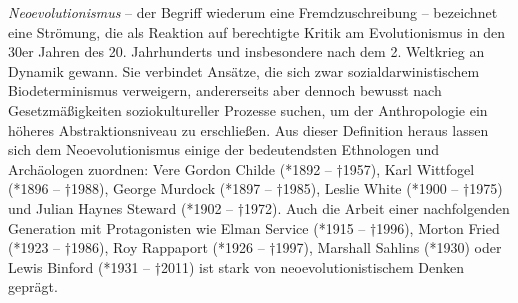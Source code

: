 \documentclass[openany,twoside,twocolumn]{book}
\begin{document}
\emph{Neoevolutionismus} -- der Begriff wiederum eine Fremdzuschreibung
-- bezeichnet eine Strömung, die als Reaktion auf berechtigte Kritik am
Evolutionismus in den 30er Jahren des 20. Jahrhunderts und insbesondere
nach dem 2. Weltkrieg an Dynamik gewann. Sie verbindet Ansätze, die sich
zwar sozialdarwinistischem Biodeterminismus verweigern, andererseits
aber dennoch bewusst nach Gesetzmäßigkeiten soziokultureller Prozesse
suchen, um der Anthropologie ein höheres Abstraktionsniveau zu
erschließen. Aus dieser Definition heraus lassen sich dem
Neoevolutionismus einige der bedeutendsten Ethnologen und Archäologen
zuordnen: Vere Gordon Childe (*1892 -- †1957), Karl Wittfogel (*1896 --
†1988), George Murdock (*1897 -- †1985), Leslie White (*1900 -- †1975)
und Julian Haynes Steward (*1902 -- †1972). Auch die Arbeit einer
nachfolgenden Generation mit Protagonisten wie Elman Service (*1915 --
†1996), Morton Fried (*1923 -- †1986), Roy Rappaport (*1926 -- †1997),
Marshall Sahlins (*1930) oder Lewis Binford (*1931 -- †2011) ist stark
von neoevolutionistischem Denken geprägt.
\end{document}
